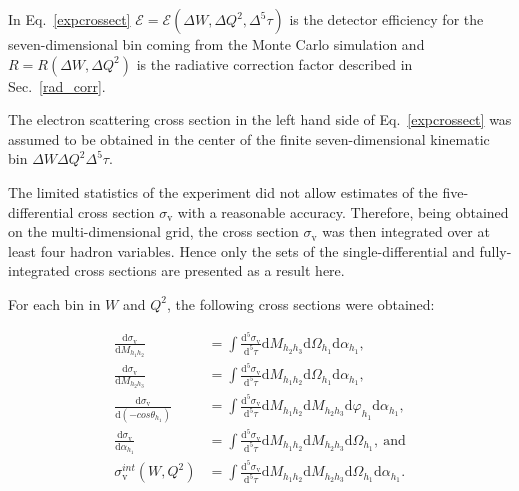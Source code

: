 \documentclass[prc,twocolumn,superscriptaddress,showpacs,amssymb,amsmath,amsfonts,aps,nofootinbib]{revtex4-1}
\begin{document}
In Eq.~\eqref{expcrossect}  $\mathcal{E} = \mathcal{E}(\Delta W, \Delta Q^{2}, \Delta^{5} \tau)$ is the detector efficiency for the seven-dimensional bin coming from the  Monte Carlo simulation and $R = R(\Delta W, \Delta Q^{2})$ is the
radiative correction factor described in Sec.~\ref{rad_corr}. 


The electron scattering cross section in the left hand side of Eq.~\eqref{expcrossect} was assumed to be obtained in the center of the finite seven-dimensional kinematic bin $\Delta W \Delta Q^{2} \Delta^{5} \tau$.





The limited
statistics of the experiment did not allow estimates
of the five-differential cross section $\sigma_{\text{v}}$ with a reasonable
accuracy. Therefore, being obtained on the multi-dimensional grid, the cross section $\sigma_{\text{v}}$ was then integrated over at least four hadron variables. Hence only the sets of the single-differential and fully-integrated cross sections are presented as a result here.

For each bin in $W$ and $Q^2$, the following cross sections were obtained:

\begin{equation}
\begin{aligned}
\frac{\textrm{d}\sigma_{\text{v}}}{\textrm{d}M_{h_{1}h_{2}}} & =
\int\frac{\textrm{d}^{5}\sigma_{\text{v}}}{\textrm{d}^{5}\tau}\textrm{d}M_{h_{2}h_{3}}\textrm{d}\Omega_{h_{1}}\textrm{d}\alpha_{h_{1}}\text{,}  \\
\frac{\textrm{d}\sigma_{\text{v}}}{\textrm{d}M_{h_{2}h_{3}}} & =
\int\frac{\textrm{d}^{5}\sigma_{\text{v}}}{\textrm{d}^{5}\tau}\textrm{d}M_{h_{1}h_{2}}\textrm{d}\Omega_{h_{1}}\textrm{d}\alpha_{h_{1}}\text{,} \\
\frac{\textrm{d}\sigma_{\text{v}}}{\textrm{d}(-cos\theta_{h_{1}})} & =
\int\frac{\textrm{d}^{5}\sigma_{\text{v}}}{\textrm{d}^{5}\tau}\textrm{d}M_{h_{1}h_{2}}\textrm{d}M_{h_{2}h_{3}}\textrm{d}\varphi_{h_{1}}\textrm{d}\alpha_{h_{1}}\text{,}  \\
\frac{\textrm{d}\sigma_{\text{v}}}{\textrm{d}\alpha_{h_{1}}} & =
\int\frac{\textrm{d}^{5}\sigma_{\text{v}}}{\textrm{d}^{5}\tau} \textrm{d}M_{h_{1}h_{2}}\textrm{d}M_{h_{2}h_{3}}\textrm{d}\Omega_{h_{1}},~\text{and} \\
\sigma^{int}_{\text{v}}(W,Q^{2}) & =
\int\frac{\textrm{d}^{5}\sigma_{\text{v}}}{\textrm{d}^{5}\tau}\textrm{d}M_{h_{1}h_{2}}\textrm{d}M_{h_{2}h_{3}}\textrm{d}\Omega_{h_{1}}\textrm{d}\alpha_{h_{1}}.
\end{aligned}
\label{inegr5diff}
\end{equation}
\end{document}
